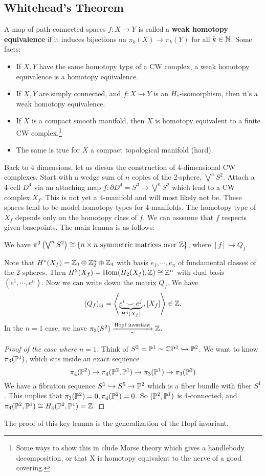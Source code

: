 \subsection{Whitehead's Theorem}
A map of path-connected spaces $f \colon X \to Y$ is called a \textbf{weak homotopy equivalence} if it induces bijections on $\pi_k(X) \to \pi_k(Y)$ for all $k \in \N$. Some facts:
\begin{itemize}
\setlength\itemsep{-.2em}
    \item If $X,Y$ have the same homotopy type of a CW complex, a weak homotopy equivalence is a homotopy equivalence. 
\item If $X,Y$ are simply connected, and $f \colon X \to Y$ is an $H_*$-isomorphism, then it's a weak homotopy equivalence.
\item If $X$ is a compact smooth manifold, then $X  $ is homotopy equivalent to a finite CW complex.\footnote{Some ways to show this in clude Morse theory which gives a handlebody decomposition, or that X is homotopy equivalent to the nerve of a good covering.}
\item The same is true for $X$ a compact topological manifold (hard).
\end{itemize}
Back to 4 dimensions, let us dicsus the construction of 4-dimensional CW complexes. Start with a wedge sum of $n$ copies of the 2-sphere, $\bigvee^n S^2$. Attach a 4-cell $D^4$ via an attaching map $f \colon \partial D^4 =S^3 \to  \bigvee^n S^2$ which lead to a CW complex $X_f$. This is not yet a 4-manifold and will most likely not be. These spaces tend to be model homotopy types for 4-manifolds. The homotopy type of $X_f$ depends only on the homotopy class of $f$. We can asssume that $f$ respects given basepoints. The main lemma is as follows: 
\begin{lemma}
    We have $\pi^3\left( \bigvee^n S^2 \right) \cong \{n \times n \text{ symmetric matrices over } \Z\} $, where $[f] \mapsto  Q_f$.
\end{lemma}
Note that $H^*(X_f)= \Z_0 \oplus \Z_2^n  \oplus \Z_4$ with basis $e_1,\cdots ,e_n $ of fundamental classes of the 2-spheres. Then $H^2(X_f)=\Hom(H_2(X_f),\Z)\cong \Z^n $ with dual basis $(e^1 ,\cdots ,e^n )$. Now we can write down the matrix $Q_f$. We have \[
    (Q_f)_{ij}= \left\langle \underset{H^4(X_f)}{\underbrace{e^i  \smile e^j }}\, , [X_f]  \right\rangle \in \Z.
\] 
    In the $n=1$ case, we have $\pi_3 (S^2) \underset{\cong }{\xrightarrow{\text{Hopf invariant} }} \Z $.
\begin{proof}[Proof of the case where $n=1$]
    Think of $S^2 = \P^1 \sim \C \mathrm{P^1}\hookrightarrow  \P^2$. We want to know $\pi_3(\P^1)$, which sits inside an exact sequence \[
        \pi_4(\P^2) \to \pi_4(\P^2,\P^1) \to \pi_3(\P^1) \to \pi_3(\P^2)
    \] We have a fibration sequence $S^1  \hookrightarrow S^5\to \P^2$ which is a fiber bundle with fiber $S^1 $. This implies that $\pi_3(\P^2)=0,\pi_4(\P^2)=0$. So $(\P^2,\P^1)$ is 4-connected, and $\pi_4(\P^2,\P^1) \cong H_4(\P^2,\P^1) =\Z$.
\end{proof}
The proof of this key lemma is the generalization of the Hopf invariant.
